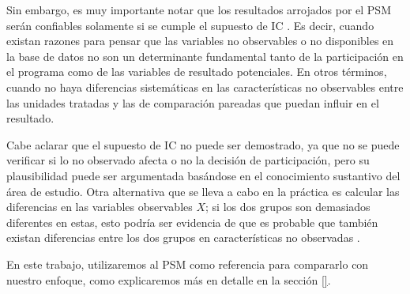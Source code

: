 \documentclass[../../main.tex]{subfiles}
\begin{document}
Sin embargo, es muy importante notar que los resultados arrojados por el PSM serán
confiables solamente si se cumple el supuesto de IC \footnotemark. Es decir, cuando
existan razones para pensar que las variables no observables o no disponibles en la base
de datos no son un determinante fundamental tanto de la participación en el programa como
de las variables de resultado potenciales. En otros términos, cuando no haya diferencias
sistemáticas en las características no observables entre las unidades tratadas y las de
comparación pareadas que puedan influir en el resultado. 

Cabe aclarar que el supuesto de IC no puede ser demostrado, ya que no se puede verificar
si lo no observado afecta o no la decisión de participación, pero su plausibilidad puede
ser argumentada basándose en el conocimiento sustantivo del área de estudio. Otra
alternativa que se lleva a cabo en la práctica es calcular las diferencias en las
variables observables \(X\); si los dos grupos son demasiados diferentes en estas, esto
podría ser evidencia de que es probable que también existan diferencias entre los dos
grupos en características no observadas \cite{bernal}.

En este trabajo, utilizaremos al PSM como referencia para compararlo con nuestro
enfoque, como explicaremos más en detalle en la sección \ref{}.
\end{document}
